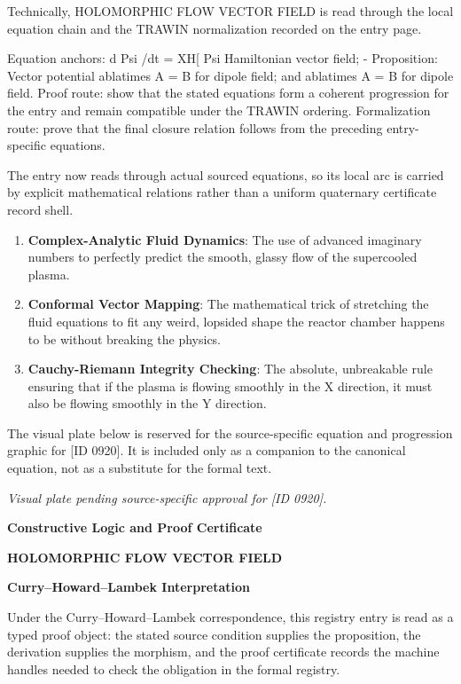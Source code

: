 Technically, HOLOMORPHIC FLOW VECTOR FIELD is read through the local equation chain and the TRAWIN normalization recorded on the entry page.

Equation anchors: d Psi /dt = XH[ Psi Hamiltonian vector field; - Proposition: Vector potential ablatimes A = B for dipole field; and ablatimes A = B for dipole field. Proof route: show that the stated equations form a coherent progression for the entry and remain compatible under the TRAWIN ordering. Formalization route: prove that the final closure relation follows from the preceding entry-specific equations.

The entry now reads through actual sourced equations, so its local arc is carried by explicit mathematical relations rather than a uniform quaternary certificate record shell.
\endgroup

\begin{enumerate}[leftmargin=1.6em,itemsep=6pt,topsep=4pt]
\item \textbf{Complex-Analytic Fluid Dynamics}: The use of advanced imaginary numbers to perfectly predict the smooth, glassy flow of the supercooled plasma.
\item \textbf{Conformal Vector Mapping}: The mathematical trick of stretching the fluid equations to fit any weird, lopsided shape the reactor chamber happens to be without breaking the physics.
\item \textbf{Cauchy-Riemann Integrity Checking}: The absolute, unbreakable rule ensuring that if the plasma is flowing smoothly in the X direction, it must also be flowing smoothly in the Y direction.
\end{enumerate}

\begingroup\footnotesize\sloppy
The visual plate below is reserved for the source-specific equation and progression graphic for [ID 0920]. It is included only as a companion to the canonical equation, not as a substitute for the formal text.
\par\endgroup
\begingroup\footnotesize\itshape
Visual plate pending source-specific approval for [ID 0920].
\par\endgroup

\clearpage
\begingroup\tzpsupportsetup
\noindent\textbf{\fontsize{10.8pt}{12.8pt}\selectfont [ID 0920] Constructive Logic and Proof Certificate}\par
\noindent\textbf{\fontsize{10pt}{12pt}\selectfont HOLOMORPHIC FLOW VECTOR FIELD}\par
\vspace{0.45em}
\begingroup
\footnotesize
\setlength{\parskip}{0.22em}
\setlength{\parindent}{0pt}
\noindent\textbf{Curry--Howard--Lambek Interpretation}\par
Under the Curry--Howard--Lambek correspondence, this registry entry is read as a typed proof
object: the stated source condition supplies the proposition, the derivation supplies the
morphism, and the proof certificate records the machine handles needed to check the obligation
in the formal registry.

